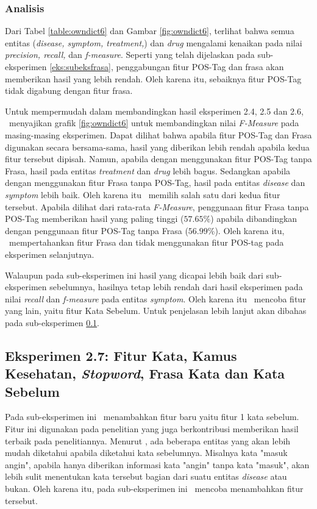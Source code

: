 	\subsubsection{Analisis}
	Dari Tabel \ref{table:owndict6} dan Gambar \ref{fig:owndict6}, terlihat bahwa semua entitas (\textit{disease, symptom, treatment,}) dan \textit{drug} mengalami kenaikan pada nilai \textit{precision, recall,} dan \textit{f-measure}. Seperti yang telah dijelaskan pada sub-eksperimen \ref{eks:subeksfrasa}, penggabungan fitur POS-Tag dan frasa akan memberikan hasil yang lebih rendah. Oleh karena itu, sebaiknya fitur POS-Tag tidak digabung dengan fitur frasa.
	
	Untuk mempermudah dalam membandingkan hasil eksperimen 2.4, 2.5 dan 2.6, \saya~menyajikan grafik \ref{fig:owndict6} untuk membandingkan nilai \textit{F-Measure} pada masing-masing eksperimen. Dapat dilihat bahwa apabila fitur POS-Tag dan Frasa digunakan secara bersama-sama, hasil yang diberikan lebih rendah apabila kedua fitur tersebut dipisah. Namun, apabila dengan menggunakan fitur POS-Tag tanpa Frasa, hasil pada entitas \textit{treatment} dan \textit{drug} lebih bagus. Sedangkan apabila dengan menggunakan fitur Frasa tanpa POS-Tag, hasil pada entitas \textit{disease} dan \textit{symptom} lebih baik. Oleh karena itu \saya~memilih salah satu dari kedua fitur tersebut. Apabila dilihat dari rata-rata \textit{F-Measure}, penggunaan fitur Frasa tanpa POS-Tag memberikan hasil yang paling tinggi ($ 57.65\% $) apabila dibandingkan dengan penggunaan fitur POS-Tag tanpa Frasa ($ 56.99\% $). Oleh karena itu, \saya~mempertahankan fitur Frasa dan tidak menggunakan fitur POS-tag pada eksperimen selanjutnya.
	
	Walaupun pada sub-eksperimen ini hasil yang dicapai lebih baik dari sub-eksperimen sebelumnya, hasilnya tetap lebih rendah dari hasil eksperimen \cite{skripsiKakRadit} pada nilai \textit{recall} dan \textit{f-measure} pada entitas \textit{symptom}. Oleh karena itu \saya~mencoba fitur yang lain, yaitu fitur Kata Sebelum. Untuk penjelasan lebih lanjut akan dibahas pada sub-eksperimen \ref{eks:subekswbef1}.
	
	\subsection{Eksperimen 2.7: Fitur Kata, Kamus Kesehatan, \textit{Stopword}, Frasa Kata dan Kata Sebelum}\label{eks:subekswbef1}
	Pada sub-eksperimen ini \saya~menambahkan fitur baru yaitu fitur 1 kata sebelum. Fitur ini digunakan pada penelitian \cite{skripsiKakRadit} yang juga berkontribusi memberikan hasil terbaik pada penelitiannya. Menurut \saya, ada beberapa entitas yang akan lebih mudah diketahui apabila diketahui kata sebelumnya. Misalnya kata "masuk angin", apabila hanya diberikan informasi kata "angin" tanpa kata "masuk", akan lebih sulit menentukan kata tersebut bagian dari suatu entitas \textit{disease} atau bukan. Oleh karena itu, pada sub-eksperimen ini \saya~mencoba menambahkan fitur tersebut.
	
